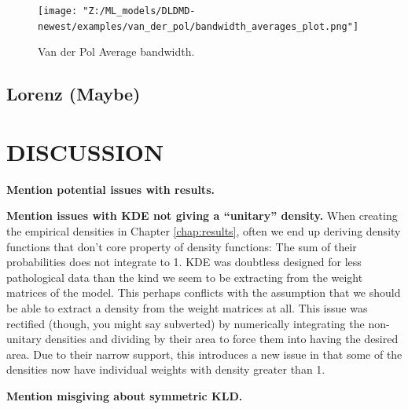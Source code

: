 \begin{figure}[ht]
    \centering
    \begin{minipage}{\textwidth}
        \texttt{[image: "Z:/ML\_models/DLDMD-newest/examples/van\_der\_pol/bandwidth\_averages\_plot.png"]} 
    \end{minipage} 
    \caption{Van der Pol Average bandwidth.}
\end{figure}

\section{Lorenz (Maybe)}

\chapter{DISCUSSION}
\label{chap:discussion}

\textbf{Mention potential issues with results.}

\textbf{Mention issues with KDE not giving a ``unitary'' density.}
When creating the empirical densities in Chapter \ref{chap:results}, often we end up deriving 
density functions that don't core property of density functions: The sum of their probabilities 
does not integrate to 1. KDE was doubtless designed for less pathological data than the kind we
seem to be extracting from the weight matrices of the model. This perhaps conflicts with the 
assumption that we should be able to extract a density from the weight matrices at all. This issue
was rectified (though, you might say subverted) by numerically integrating the non-unitary densities
and dividing by their area to force them into having the desired area. Due to their narrow support,
this introduces a new issue in that some of the densities now have individual weights with density 
greater than 1.

\textbf{Mention misgiving about symmetric KLD.}